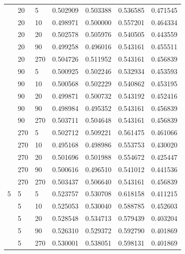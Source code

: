 \documentclass[pageno]{jpaper}
\begin{document}
\begin{longtable}{p{2cm} p{2cm} p{2cm} p{2cm} p{2cm} p{2cm} p{2cm}}
& 20 & 5 & 0.502909 & 0.503388 & 0.536585 & 0.471545 \\

& 20 & 10 & 0.498971 & 0.500000 & 0.557201 & 0.464334 \\

& 20 & 20 & 0.502578 & 0.505976 & 0.540505 & 0.443559 \\

& 20 & 90 & 0.499258 & 0.496016 & 0.543161 & 0.455511 \\

& 20 & 270 & 0.504726 & 0.511952 & 0.543161 & 0.456839 \\

& 90 & 5 & 0.500925 & 0.502246 & 0.532934 & 0.453593 \\

& 90 & 10 & 0.500568 & 0.502229 & 0.540862 & 0.453195 \\

& 90 & 20 & 0.499871 & 0.500732 & 0.543192 & 0.452416 \\

& 90 & 90 & 0.498984 & 0.495352 & 0.543161 & 0.456839 \\

& 90 & 270 & 0.503711 & 0.504648 & 0.543161 & 0.456839 \\

& 270 & 5 & 0.502712 & 0.509221 & 0.561475 & 0.461066 \\

& 270 & 10 & 0.495168 & 0.498986 & 0.553753 & 0.430020 \\

& 270 & 20 & 0.501696 & 0.501988 & 0.554672 & 0.425447 \\

& 270 & 90 & 0.500616 & 0.496510 & 0.541012 & 0.441536 \\

& 270 & 270 & 0.503437 & 0.506640 & 0.543161 & 0.456839 \\
\hline
5 & 5 & 5 & 0.523757 & 0.530708 & 0.618158 & 0.411215 \\

& 5 & 10 & 0.525053 & 0.530040 & 0.588785 & 0.452603 \\

& 5 & 20 & 0.528548 & 0.534713 & 0.579439 & 0.403204 \\

& 5 & 90 & 0.526310 & 0.529372 & 0.592790 & 0.401869 \\

& 5 & 270 & 0.530001 & 0.538051 & 0.598131 & 0.401869 \\


\end{longtable}
\end{document}
